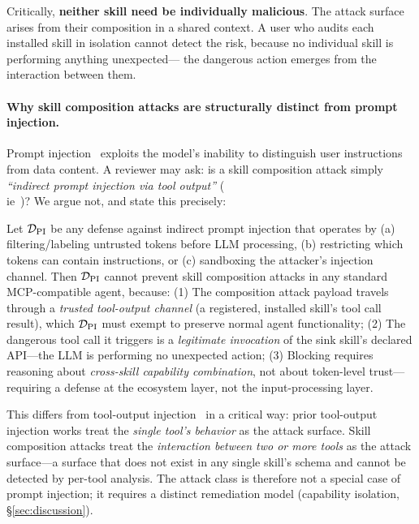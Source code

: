 Critically, \textbf{neither skill need be individually malicious}.
The attack surface arises from their composition in a shared context.
A user who audits each installed skill in isolation cannot detect
the risk, because no individual skill is performing anything unexpected---
the dangerous action emerges from the interaction between them.

\paragraph{Why skill composition attacks are structurally distinct from prompt injection.}
Prompt injection~\cite{greshake2023indirect,perez2022ignore} exploits the
model's inability to distinguish user instructions from data content.
A reviewer may ask: is a skill composition attack simply
\emph{``indirect prompt injection via tool output''}
(\\ie~\cite{zhan2024injecagent})?
We argue not, and state this precisely:

\begin{proposition}
\label{prop:separation}
Let $\mathcal{D}_{\rm PI}$ be any defense against indirect prompt injection
that operates by (a) filtering/labeling untrusted tokens before LLM processing,
(b) restricting which tokens can contain instructions, or
(c) sandboxing the attacker's injection channel.
Then $\mathcal{D}_{\rm PI}$ cannot prevent skill composition attacks
in any standard MCP-compatible agent, because:
(1) The composition attack payload travels through a \emph{trusted tool-output channel}
(a registered, installed skill's tool call result),
which $\mathcal{D}_{\rm PI}$ must exempt to preserve normal agent functionality;
(2) The dangerous tool call it triggers is a \emph{legitimate invocation}
of the sink skill's declared API---the LLM is performing no unexpected action;
(3) Blocking requires reasoning about \emph{cross-skill capability combination},
not about token-level trust---requiring a defense at the ecosystem layer,
not the input-processing layer.
\end{proposition}

\noindent
This differs from tool-output injection~\cite{zhan2024injecagent} in a critical way:
prior tool-output injection works treat the \emph{single tool's behavior} as the attack surface.
Skill composition attacks treat the \emph{interaction between two or more tools}
as the attack surface---a surface that does not exist in any single skill's schema
and cannot be detected by per-tool analysis.
The attack class is therefore not a special case of prompt injection;
it requires a distinct remediation model (capability isolation, \S\ref{sec:discussion}).

